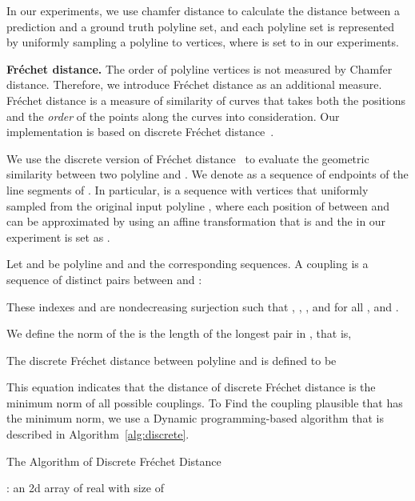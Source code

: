 \documentclass{article}
\theoremstyle{plain}
\theoremstyle{definition}
\theoremstyle{remark}
\begin{document}
In our experiments, we use chamfer distance to calculate the distance between a prediction and a ground truth polyline set, and each polyline set is represented by uniformly sampling a polyline to  vertices, where  is set to  in our experiments. 


\noindent\textbf{Fr\'echet distance.}
The order of polyline vertices is not measured by Chamfer distance. Therefore, we introduce Fr\'echet distance as an additional measure. Fr\'echet distance is a measure of similarity of curves that takes both the positions and the \emph{order} of the points along the curves into consideration. Our implementation is based on discrete Fr\'echet distance~\citep{eiter1994computing,agarwal2014computing}. 

We use the discrete version of Fr\'echet distance~\citep{eiter1994computing,agarwal2014computing} to evaluate the geometric similarity between two polyline  and . We denote  as a sequence of endpoints of the line segments of . In particular,  is a sequence with  vertices that uniformly sampled from the original input polyline , where 
each position of  between  and  can be approximated by using an affine transformation that is  and the  in our experiment is set as .

Let  and  be polyline and  and  the corresponding sequences.
A coupling  is a sequence of distinct pairs between  and : 

These indexes  and  are nondecreasing surjection such that , , ,  and for all ,  and .

We define the norm  of the  is the length of the longest pair in , that is,


The discrete Fr\'echet distance between polyline  and  is defined to be

This equation indicates that the distance of discrete Fr\'echet distance is the minimum norm of all possible couplings. To Find the coupling plausible  that has the minimum norm, we use a Dynamic programming-based algorithm that is described in Algorithm~\ref{alg:discrete}.

\begin{algorithm}[H]
    \caption{The Algorithm of Discrete Fr\'echet Distance}
    \SetAlgoLined
    \KwOut{}
     : an 2d array of real with size of \;
    
    \label{alg:discrete}
\end{algorithm}
\end{document}
